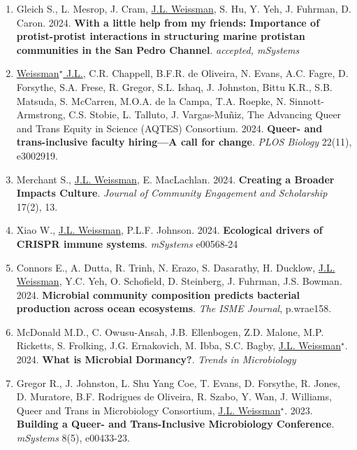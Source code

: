 \documentclass[]{res}
\begin{document}
\begin{resume}
\begin{enumerate}[leftmargin=*]
 \setlength\itemsep{0.25em}
 
\item Gleich S., L. Mesrop, J. Cram, \underline{J.L. Weissman}, S. Hu, Y. Yeh, J. Fuhrman, D. Caron. 2024. {\bf With a little help from my friends: Importance of protist-protist interactions in structuring marine protistan communities in the San Pedro Channel}. \emph{accepted, mSystems}
 
\item \underline{Weissman$^\star$ J.L.}, C.R. Chappell, B.F.R. de Oliveira, N. Evans, A.C. Fagre, D. Forsythe, S.A. Frese, R. Gregor, S.L. Ishaq, J. Johnston, Bittu K.R., S.B. Matsuda, S. McCarren, M.O.A. de la Campa, T.A. Roepke, N. Sinnott-Armstrong, C.S. Stobie, L. Talluto, J. Vargas-Muñiz, The Advancing Queer and Trans Equity in Science (AQTES) Consortium. 2024. {\bf Queer- and trans-inclusive faculty hiring—A call for change}. \emph{PLOS Biology} 22(11), e3002919.
 
 \item Merchant S., \underline{J.L. Weissman}, E. MacLachlan. 2024. {\bf Creating a Broader Impacts Culture}. \emph{Journal of Community Engagement and Scholarship} 17(2), 13.
 
 \item Xiao W., \underline{J.L. Weissman}, P.L.F. Johnson. 2024. {\bf Ecological drivers of CRISPR immune systems}. \emph{mSystems} e00568-24
 
 \item Connors E., A. Dutta, R. Trinh, N. Erazo, S. Dasarathy, H. Ducklow, \underline{J.L. Weissman}, Y.C. Yeh, O. Schofield, D. Steinberg, J. Fuhrman, J.S. Bowman. 2024. {\bf Microbial community composition predicts bacterial production across ocean ecosystems}. \emph{The ISME Journal}, p.wrae158.

 \item McDonald M.D., C. Owusu-Ansah, J.B. Ellenbogen, Z.D. Malone, M.P. Ricketts, S. Frolking, J.G. Ernakovich, M. Ibba, S.C. Bagby, \underline{J.L. Weissman$^\star$}. 2024. {\bf What is Microbial Dormancy?}. \emph{Trends in Microbiology}

 \item Gregor R., J. Johnston, L. Shu Yang Coe, T. Evans, D. Forsythe, R. Jones, D. Muratore, B.F. Rodrigues de Oliveira, R. Szabo, Y. Wan, J. Williams, Queer and Trans in Microbiology Consortium, \underline{J.L. Weissman$^\star$}. 2023. {\bf Building a Queer- and Trans-Inclusive Microbiology Conference}. \emph{mSystems} 8(5), e00433-23.
 

\end{enumerate}
\end{resume}
\end{document}
